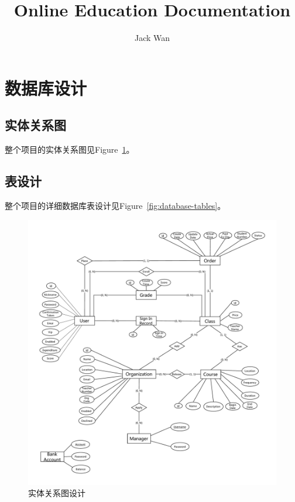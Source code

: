 \documentclass[11pt]{article}
\title{\textbf{Online Education Documentation}}
\author{Jack Wan}
\begin{document}
\maketitle
\newpage

\section{数据库设计}
\subsection{实体关系图}
整个项目的实体关系图见Figure~\ref{fig:ER-diagram}。
\subsection{表设计}
整个项目的详细数据库表设计见Figure~\ref{fig:database-tables}。

\begin{figure}[h]
  	\includegraphics[width=\linewidth]{img/ER-diagram.pdf}
  	\caption{实体关系图设计}
  	\label{fig:ER-diagram}
\end{figure}
\end{document}
